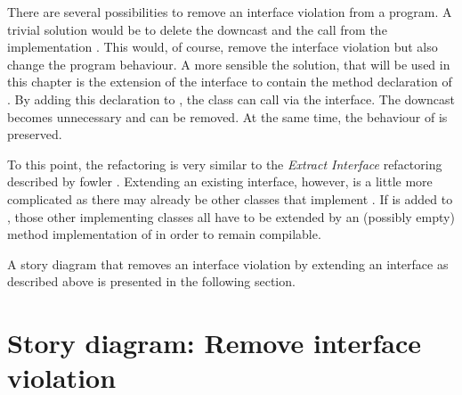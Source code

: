 There are several possibilities to remove an interface violation from a program. A trivial solution would be to delete the downcast and the call from the implementation . This would, of course, remove the interface violation but also change the program behaviour. A more sensible the solution, that will be used in this chapter is the extension of the interface  to contain the method declaration of . By adding this declaration to , the class  can call  via the interface. The downcast becomes unnecessary and can be removed. At the same time, the behaviour of  is preserved.

To this point, the refactoring is very similar to the \emph{Extract Interface} refactoring described by fowler \cite{Fow99}. Extending an existing interface, however, is a little more complicated as there may already be other classes that implement . If  is added to , those other implementing classes all have to be extended by an (possibly empty) method implementation of  in order to remain compilable.

A story diagram that removes an interface violation by extending an interface as described above is presented in the following section.

\section{Story diagram: Remove interface violation}

